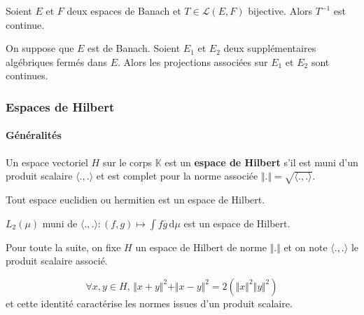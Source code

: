   \begin{corollary}
    Soient $E$ et $F$ deux espaces de Banach et $T \in \mathcal{L}(E,F)$ bijective. Alors $T^{-1}$ est continue.
  \end{corollary}

  \begin{corollary}
    On suppose que $E$ est de Banach. Soient $E_1$ et $E_2$ deux supplémentaires algébriques fermés dans $E$. Alors les projections associées sur $E_1$ et $E_2$ sont continues.
  \end{corollary}

  \subsubsection{Espaces de Hilbert}

  \paragraph{Généralités}


  \begin{definition}
    Un espace vectoriel $H$ sur le corps $\mathbb{K}$ est un \textbf{espace de Hilbert} s'il est muni d'un produit scalaire $\langle . , . \rangle$ et est complet pour la norme associée $\Vert . \Vert = \sqrt{\langle . , . \rangle}$.
  \end{definition}

  \begin{example}
    Tout espace euclidien ou hermitien est un espace de Hilbert.
  \end{example}

  \begin{example}
    $L_2(\mu)$ muni de $\langle . , . \rangle : (f,g) \mapsto \int f \overline{g} \, \mathrm{d}\mu$ est un espace de Hilbert.
  \end{example}

  Pour toute la suite, on fixe $H$ un espace de Hilbert de norme $\Vert . \Vert$ et on note $\langle ., . \rangle$ le produit scalaire associé.

  \begin{lemma}
    \[ \forall x, y \in H, \, \Vert x + y \Vert^2 + \Vert x - y \Vert^2 = 2(\Vert x \Vert^2 \Vert y \Vert^2) \]
    et cette identité caractérise les normes issues d'un produit scalaire.
  \end{lemma}


